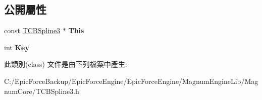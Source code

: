 \subsection*{公開屬性}
\begin{DoxyCompactItemize}
\item 
const \hyperlink{class_magnum_1_1_t_c_b_spline3}{T\+C\+B\+Spline3} $\ast$ {\bfseries This}\hypertarget{class_magnum_1_1_t_c_b_spline3_1_1_this_plus_key_a9c64fdc4e89f0a7ce13ddeda9e9ff085}{}\label{class_magnum_1_1_t_c_b_spline3_1_1_this_plus_key_a9c64fdc4e89f0a7ce13ddeda9e9ff085}

\item 
int {\bfseries Key}\hypertarget{class_magnum_1_1_t_c_b_spline3_1_1_this_plus_key_afbc44c05dc25771f758dd3fb0b64a611}{}\label{class_magnum_1_1_t_c_b_spline3_1_1_this_plus_key_afbc44c05dc25771f758dd3fb0b64a611}

\end{DoxyCompactItemize}


此類別(class) 文件是由下列檔案中產生\+:\begin{DoxyCompactItemize}
\item 
C\+:/\+Epic\+Force\+Backup/\+Epic\+Force\+Engine/\+Epic\+Force\+Engine/\+Magnum\+Engine\+Lib/\+Magnum\+Core/T\+C\+B\+Spline3.\+h\end{DoxyCompactItemize}
